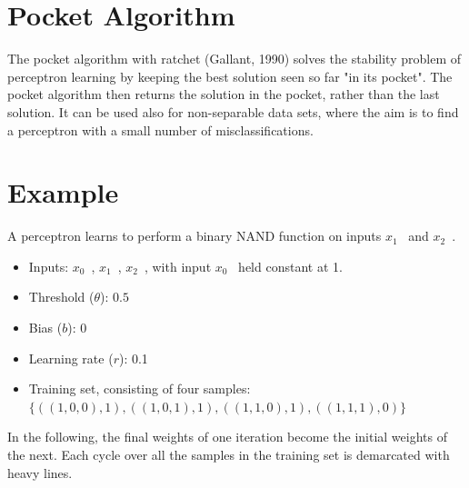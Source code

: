 \documentclass[12pt, right open]{memoir}
\makeatletter
\newcommand{\specialcell}[2][c]{%
  \begin{tabular}[#1]{@{}c@{}}#2\end{tabular}}
\makeatother
\begin{document}
\section{Pocket Algorithm}
The pocket algorithm with ratchet (Gallant, 1990) solves the stability problem of perceptron learning by keeping the best solution seen so far "in its pocket". The pocket algorithm then returns the solution in the pocket, rather than the last solution. It can be used also for non-separable data sets, where the aim is to find a perceptron with a small number of misclassifications.


\section{Example}
A perceptron learns to perform a binary NAND function on inputs $x_1$ \, and $x_2$ \,.

\begin{itemize}
\item Inputs: $x_0$ \,, $x_1$ \,, $x_2$ \,, with input $x_0$ \, held constant at 1.
\item Threshold ($\theta$): $0.5$
\item Bias ($b$): 0
\item Learning rate ($r$): 0.1
\item Training set, consisting of four samples: $\{((1, 0, 0), 1), ((1, 0, 1), 1), ((1, 1, 0), 1), ((1, 1, 1), 0)\}$ \,
\end{itemize}


In the following, the final weights of one iteration become the initial weights of the next. Each cycle over all the samples in the training set is demarcated with heavy lines.


%
%
%
%
\end{document}
